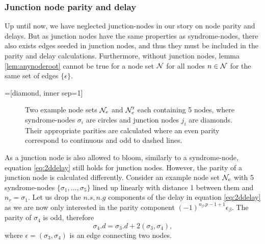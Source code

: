 \subsubsection{Junction node parity and delay}

Up until now, we have neglected junction-nodes in our story on node parity and delays. But as junction nodes have the same properties as syndrome-nodes, there also exists edges seeded in junction nodes, and thus they must be included in the parity and delay calculations. Furthermore, without junction nodes, lemma \ref{lem:anynoderoot} cannot be true for a node set $\mathcal{N}$ for all nodes $n \in \mathcal{N}$ for the same set of edges $\{\epsilon\}$.

=[diamond, inner sep=1]
\begin{figure}
  \centering
  \caption{Two example node sets $\mathcal{N}_e$ and $\mathcal{N}_e'$ each containing 5 nodes, where syndrome-nodes $\sigma_i$ are circles and junction nodes $j_i$ are diamonds. Their appropriate parities are calculated where an even parity correspond to continuous and odd to dashed lines. }\label{fig:junctionparity}
\end{figure}
As a junction node is also allowed to bloom, similarly to a syndrome-node, equation \ref{eq:2ddelay} still holds for junction nodes. However, the parity of a junction node is calculated differently. Consider an example node set $\mathcal{N}_e$ with 5 syndrome-nodes $\{\sigma_1,...,\sigma_5\}$ lined up linearly with distance 1 between them and $n_r = \sigma_1$. Let us drop the $n.s, n.g$ components of the delay in equation \ref{eq:2ddelay} as we are now only interested in the parity component $(-1)^{n_\beta.p-1+1}\epsilon_\beta$. The parity of $\sigma_4$ is odd, therefore
\begin{equation*}
  \sigma_4.d = \sigma_3.d + 2(\sigma_3, \sigma_4),
\end{equation*}
where $\epsilon = (\sigma_3, \sigma_4)$ is an edge connecting two nodes.

